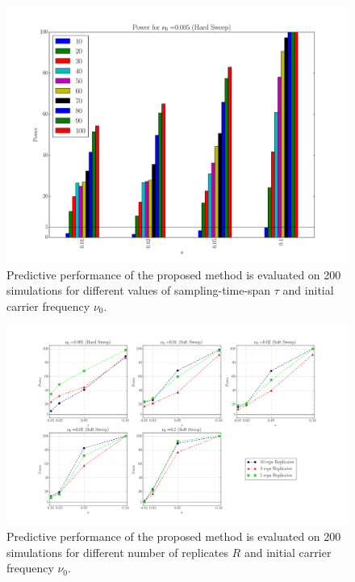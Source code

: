 \documentclass[11pt]{article}
\begin{document}
\begin{figure}[H]
	\centering
	\includegraphics[trim=2.2in 0 2.2in 0 , clip,width=\textwidth]{powerTime}
	\caption{Predictive performance of the proposed method is evaluated 
		on 200 simulations for different values of sampling-time-span 
		$\tau$ and initial carrier frequency $\nu_0$.} \label{fig:powert}
\end{figure}
\begin{figure}[H]
	\centering
	\includegraphics[trim=2.2in 0 2.2in 0, 
	clip,width=\textwidth]{powerReplicate}
	\caption{Predictive performance of the proposed method is evaluated on 200 
		simulations for different number of replicates $R$ and initial carrier 
		frequency $\nu_0$.} \label{fig:powerr}
\end{figure}
\end{document}
